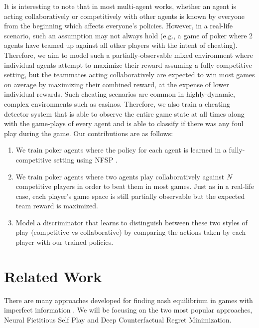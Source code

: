 \documentclass{article}
\begin{document}
It is interesting to note that in most multi-agent works, whether an agent is acting collaboratively or competitively with other agents is known by everyone from the beginning which affects everyone's policies. However, in a real-life scenario, such an assumption may not always hold (e.g., a game of poker where 2 agents have teamed up against all other players with the intent of cheating). Therefore, we aim to model such a partially-observable mixed environment where individual agents attempt to maximize their reward assuming a fully competitive setting, but the teammates acting collaboratively are expected to win most games on average by maximizing their combined reward, at the expense of lower individual rewards. Such cheating scenarios are common in highly-dynamic, complex environments such as casinos. Therefore, we also train a cheating detector system that is able to observe the entire game state at all times along with the game-plays of every agent and is able to classify if there was any foul play during the game. Our contributions are as follows:

\begin{enumerate}
    \setlength{\itemsep}{0pt}
    \item We train poker agents where the policy for each agent is learned in a fully-competitive setting using NFSP \cite{nsfp:2016}.

    \item We train poker agents where two agents play collaboratively against $N$ competitive players in order to beat them in most games. Just as in a real-life case, each player's game space is still partially observable but the expected team reward is maximized.

    \item Model a discriminator that learns to distinguish between these two styles of play (competitive vs collaborative) by comparing the actions taken by each player with our trained policies. 
\end{enumerate}


\section{Related Work} %

There are many approaches developed for finding nash equilibrium in games with imperfect information \cite{rebel:2020, dcfr:2018, nsfp:2016, deepstack}. We will be focusing on the two most popular approaches, Neural Fictitious Self Play and Deep Counterfactual Regret Minimization.
\end{document}
